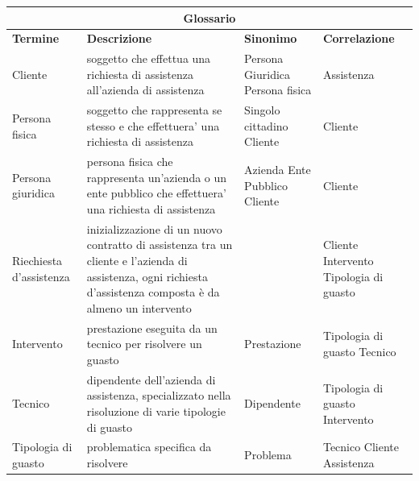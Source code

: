 \documentclass[legalpaper]{article}
\begin{document}
\begin{tabular}{ |p{1.8cm}|p{8cm}|p{3cm}|p{2.5cm}| }
\hline
\multicolumn{4}{|c|}{\textbf{Glossario}} \\
\hline
\textbf{Termine} & \textbf{Descrizione} & \textbf{Sinonimo} & \textbf{Correlazione} \\
\hline
Cliente &  soggetto che effettua una richiesta di assistenza all'azienda di assistenza & Persona Giuridica \newline Persona fisica & Assistenza\\
\hline

Persona fisica &  soggetto che rappresenta se stesso e che effettuera' una richiesta di assistenza &  Singolo cittadino \newline Cliente &  Cliente \\ \hline

Persona giuridica &  persona fisica che rappresenta un'azienda o un ente pubblico che effettuera' una richiesta di assistenza & Azienda \newline Ente Pubblico \newline Cliente &  Cliente \\ \hline

Riechiesta d'assistenza & inizializzazione di un nuovo contratto di assistenza tra un cliente e l'azienda di assistenza, ogni richiesta d'assistenza composta è da almeno un intervento   &  & Cliente \newline Intervento \newline Tipologia di guasto \\ \hline

Intervento & prestazione eseguita da un tecnico per risolvere un guasto & Prestazione & Tipologia di guasto \newline Tecnico \\ \hline

Tecnico  & dipendente dell'azienda di assistenza, specializzato nella risoluzione di varie tipologie di guasto & Dipendente & Tipologia di guasto \newline Intervento \\ \hline

Tipologia di guasto  & problematica specifica da risolvere  & Problema &  Tecnico  \newline Cliente \newline Assistenza \\ \hline

\end{tabular}
\pagebreak
\end{document}
